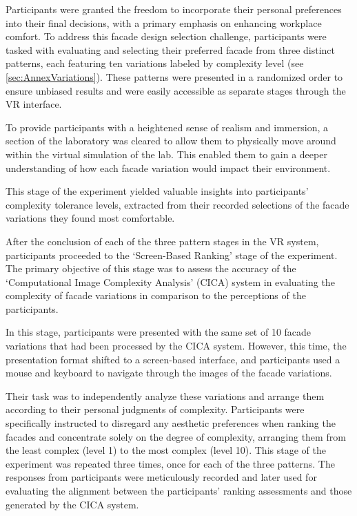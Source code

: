 Participants were granted the freedom to incorporate their personal preferences into their final decisions, with a primary emphasis on enhancing workplace comfort.
To address this facade design selection challenge, participants were tasked with evaluating and selecting their preferred facade from three distinct patterns, each featuring ten variations labeled by complexity level (see \ref{sec:AnnexVariations}).
These patterns were presented in a randomized order to ensure unbiased results and were easily accessible as separate stages through the VR interface.

To provide participants with a heightened sense of realism and immersion, a section of the laboratory was cleared to allow them to physically move around within the virtual simulation of the lab.
This enabled them to gain a deeper understanding of how each facade variation would impact their environment.

This stage of the experiment yielded valuable insights into participants' complexity tolerance levels, extracted from their recorded selections of the facade variations they found most comfortable.



After the conclusion of each of the three pattern stages in the VR system, participants proceeded to the `Screen-Based Ranking' stage of the experiment.
The primary objective of this stage was to assess the accuracy of the `Computational Image Complexity Analysis' (CICA) system in evaluating the complexity of facade variations in comparison to the perceptions of the participants.

In this stage, participants were presented with the same set of 10 facade variations that had been processed by the CICA system.
However, this time, the presentation format shifted to a screen-based interface, and participants used a mouse and keyboard to navigate through the images of the facade variations.

Their task was to independently analyze these variations and arrange them according to their personal judgments of complexity.
Participants were specifically instructed to disregard any aesthetic preferences when ranking the facades and concentrate solely on the degree of complexity, arranging them from the least complex (level 1) to the most complex (level 10).
This stage of the experiment was repeated three times, once for each of the three patterns.
The responses from participants were meticulously recorded and later used for evaluating the alignment between the participants' ranking assessments and those generated by the CICA system.

